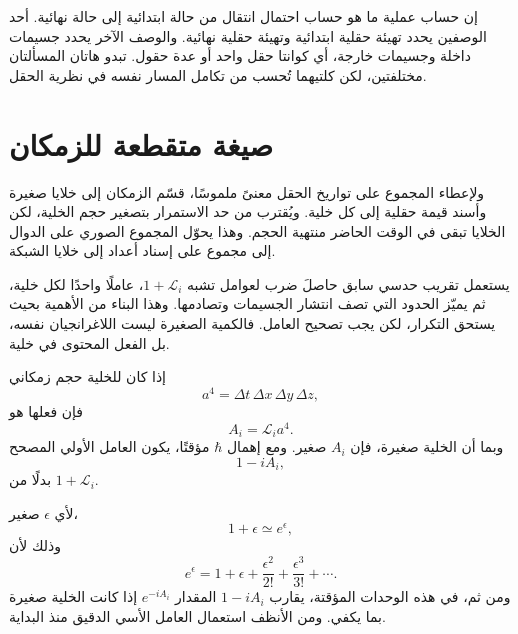 إن حساب عملية ما هو حساب احتمال انتقال من حالة ابتدائية إلى حالة نهائية. أحد الوصفين يحدد تهيئة حقلية ابتدائية وتهيئة حقلية نهائية. والوصف الآخر يحدد جسيمات داخلة وجسيمات خارجة، أي كوانتا حقل واحد أو عدة حقول. تبدو هاتان المسألتان مختلفتين، لكن كلتيهما تُحسب من تكامل المسار نفسه في نظرية الحقل.

\section{صيغة متقطعة للزمكان}

ولإعطاء المجموع على تواريخ الحقل معنىً ملموسًا، قسّم الزمكان إلى خلايا صغيرة وأسند قيمة حقلية إلى كل خلية. ويُقترب من حد الاستمرار بتصغير حجم الخلية، لكن الخلايا تبقى في الوقت الحاضر منتهية الحجم. وهذا يحوّل المجموع الصوري على الدوال إلى مجموع على إسناد أعداد إلى خلايا الشبكة.

يستعمل تقريب حدسي سابق حاصلَ ضرب لعوامل تشبه \(1+\mathcal{L}_i\)، عاملًا واحدًا لكل خلية، ثم يميّز الحدود التي تصف انتشار الجسيمات وتصادمها. وهذا البناء من الأهمية بحيث يستحق التكرار، لكن يجب تصحيح العامل. فالكمية الصغيرة ليست اللاغرانجيان نفسه، بل الفعل المحتوى في خلية.

إذا كان للخلية حجم زمكاني
\begin{equation}
a^4=\Delta t\,\Delta x\,\Delta y\,\Delta z,
\end{equation}
فإن فعلها هو
\begin{equation}
A_i=\mathcal{L}_i a^4.
\end{equation}
وبما أن الخلية صغيرة، فإن \(A_i\) صغير. ومع إهمال \(\hbar\) مؤقتًا، يكون العامل الأولي المصحح
\begin{equation}
1-iA_i,
\end{equation}
بدلًا من \(1+\mathcal{L}_i\).

لأي \(\epsilon\) صغير،
\begin{equation}
1+\epsilon\simeq e^\epsilon,
\end{equation}
وذلك لأن
\begin{equation}
e^\epsilon
=1+\epsilon+\frac{\epsilon^2}{2!}
+\frac{\epsilon^3}{3!}+\cdots.
\end{equation}
ومن ثم، في هذه الوحدات المؤقتة، يقارب \(1-iA_i\) المقدار \(e^{-iA_i}\) إذا كانت الخلية صغيرة بما يكفي. ومن الأنظف استعمال العامل الأسي الدقيق منذ البداية.

\begin{classroomqa}
\end{classroomqa}

